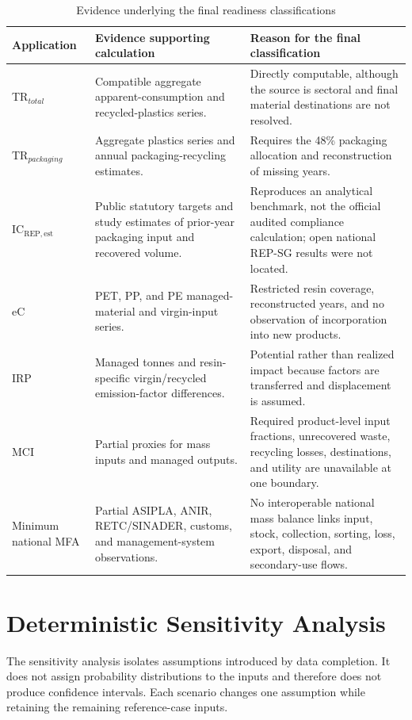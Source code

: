 \documentclass[review,10pt]{elsarticle}
\begin{document}
\begin{longtable}{|L{2.7cm}|L{6.0cm}|L{6.0cm}|}
\caption{Evidence underlying the final readiness classifications}
\label{tab:s_readiness_evidence}\\
\hline
\textbf{Application} & \textbf{Evidence supporting calculation} & \textbf{Reason for the final classification} \\
\hline
\endfirsthead
\hline
TR$_{total}$ & Compatible aggregate apparent-consumption and recycled-plastics series. & Directly computable, although the source is sectoral and final material destinations are not resolved. \\
\hline
TR$_{packaging}$ & Aggregate plastics series and annual packaging-recycling estimates. & Requires the 48\% packaging allocation and reconstruction of missing years. \\
\hline
IC$_{\mathrm{REP,est}}$ & Public statutory targets and study estimates of prior-year packaging input and recovered volume. & Reproduces an analytical benchmark, not the official audited compliance calculation; open national REP-SG results were not located. \\
\hline
eC & PET, PP, and PE managed-material and virgin-input series. & Restricted resin coverage, reconstructed years, and no observation of incorporation into new products. \\
\hline
IRP & Managed tonnes and resin-specific virgin/recycled emission-factor differences. & Potential rather than realized impact because factors are transferred and displacement is assumed. \\
\hline
MCI & Partial proxies for mass inputs and managed outputs. & Required product-level input fractions, unrecovered waste, recycling losses, destinations, and utility are unavailable at one boundary. \\
\hline
Minimum national MFA & Partial ASIPLA, ANIR, RETC/SINADER, customs, and management-system observations. & No interoperable national mass balance links input, stock, collection, sorting, loss, export, disposal, and secondary-use flows. \\
\hline
\end{longtable}

\section{Deterministic Sensitivity Analysis}

The sensitivity analysis isolates assumptions introduced by data completion. It does not assign probability distributions to the inputs and therefore does not produce confidence intervals. Each scenario changes one assumption while retaining the remaining reference-case inputs.
\end{document}
